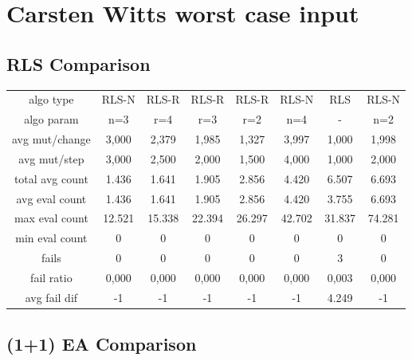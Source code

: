
\section{Carsten Witts worst case input}

\subsection{RLS Comparison}


\begin{tabular}[h]{cccccccc}
algo type&         RLS-N&  RLS-R&  RLS-R&  RLS-R&  RLS-N&    RLS&  RLS-N\\
algo param&          n=3&    r=4&    r=3&    r=2&    n=4&      -&    n=2\\
avg mut/change&    3,000&  2,379&  1,985&  1,327&  3,997&  1,000&  1,998\\
avg mut/step&      3,000&  2,500&  2,000&  1,500&  4,000&  1,000&  2,000\\
\hline
total avg count&   1.436&  1.641&  1.905&  2.856&  4.420&  6.507&  6.693\\
avg eval count&    1.436&  1.641&  1.905&  2.856&  4.420&  3.755&  6.693\\
max eval count&   12.521& 15.338& 22.394& 26.297& 42.702& 31.837& 74.281\\
min eval count&        0&      0&      0&      0&      0&      0&      0\\
\hline
fails&                 0&      0&      0&      0&      0&      3&      0\\
fail ratio&        0,000&  0,000&  0,000&  0,000&  0,000&  0,003&  0,000\\
avg fail dif&         -1&     -1&     -1&     -1&     -1&  4.249&     -1\\
\end{tabular}


\subsection{(1+1) EA Comparison}


